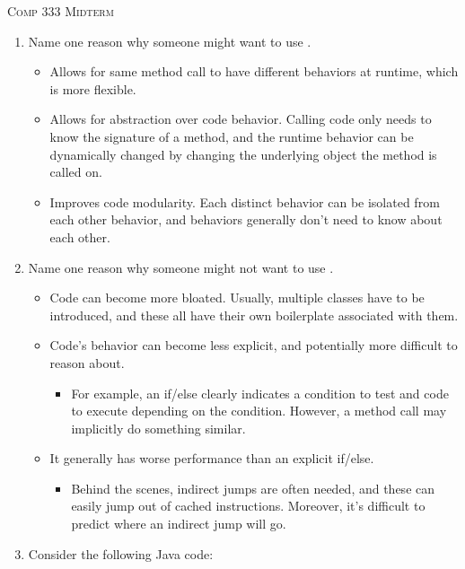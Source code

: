 \documentclass[12pt,a4paper]{article}
\begin{document}
  \begin{center}
    \large\textsc{Comp 333 Midterm}
  \end{center}
  \begin{enumerate}
    \item Name one reason why someone might want to use . %
    \begin{itemize}
      \item Allows for same method call to have different behaviors at runtime, which is more flexible.
      \item Allows for abstraction over code behavior. Calling code only needs to know the signature of a method, and the runtime behavior can be dynamically changed by changing the underlying object the method is called on.
      \item Improves code modularity. Each distinct behavior can be isolated from each other behavior, and behaviors generally don't need to know about each other.
    \end{itemize}
    \item Name one reason why someone might not want to use . %
    \begin{itemize}
      \item Code can become more bloated. Usually, multiple classes have to be introduced, and these all have their own boilerplate associated with them.
      \item Code's behavior can become less explicit, and potentially more difficult to reason about.
      \begin{itemize}
        \item For example, an if/else clearly indicates a condition to test and code to execute depending on the condition. However, a method call may implicitly do something similar.
      \end{itemize}
      \item It generally has worse performance than an explicit if/else.
      \begin{itemize}
        \item Behind the scenes, indirect jumps are often needed, and these can easily jump out of cached instructions. Moreover, it's difficult to predict where an indirect jump will go.
      \end{itemize}
    \end{itemize}
    \clearpage
    \item Consider the following Java code: %
    \begin{itemize}

\end{itemize}
\end{enumerate}
\end{document}
